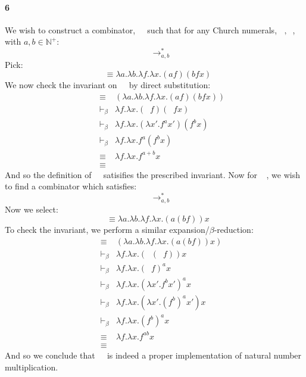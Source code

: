 \documentclass{article}
\begin{document}
\paragraph{6}
\newcommand{\Plus}{\mathop{\underline{Plus}} \:}
\newcommand{\Times}{\mathop{\underline{Times}} \:}
\newcommand{\Comb}[1]{\mathop{\underline{#1}}}

We wish to construct a combinator, $\Plus$ such that for any Church numerals, $\Comb{a}, \Comb{b}$, with $a, b \in \mathbb{N}^+$:
\[ \Plus \Comb{a} \: \Comb{b} \to^*_{a,b} \Comb{a + b} \]
Pick:
\[ \Plus \equiv \lambda a . \lambda b . \lambda f . \lambda x . (a f) (b f x) \]
We now check the invariant on $\Plus$ by direct substitution:
\begin{eqnarray*}
\Plus \Comb{a} \: \Comb{b} & \equiv & (\lambda a . \lambda b . \lambda f . \lambda x . (a f) (b f x)) \Comb{a} \Comb{b}\\
& \vdash_\beta & \lambda f. \lambda x. (\Comb{a} f) (\Comb{b} f x) \\
& \vdash_\beta & \lambda f. \lambda x. (\lambda x'. f^a x') (f^b x) \\
& \vdash_\beta & \lambda f. \lambda x. f^a ( f^b x) \\
& \equiv & \lambda f. \lambda x. f^{a + b} x \\
& \equiv & \Comb{a + b}
\end{eqnarray*}
And so the definition of $\Plus$ satisifies the prescribed invariant.  Now for $\Times$, we wish to find a combinator which satisfies:
\[ \Times \Comb{a} \: \Comb{b} \to^*_{a,b} \Comb{a b} \]
Now we select:
\[ \Times \equiv \lambda a . \lambda b . \lambda f . \lambda x . (a ( b f )) x  \]
To check the invariant, we perform a similar expansion/$\beta$-reduction:
\begin{eqnarray*}
\Times \Comb{a} \: \Comb{b} & \equiv & (\lambda a . \lambda b . \lambda f . \lambda x . (a ( b f )) x) \Comb{a} \: \Comb{b} \\
& \vdash_\beta & \lambda f . \lambda x . (\Comb{a} ( \Comb{b} f )) x \\
& \vdash_\beta & \lambda f . \lambda x . (\Comb{b} f)^a x \\
& \vdash_\beta & \lambda f . \lambda x . (\lambda x' . f^b x')^a x \\
& \vdash_\beta & \lambda f. \lambda x . (\lambda x' . (f^b)^a x') x \\
& \vdash_\beta & \lambda f. \lambda x . (f^b)^a x \\
& \equiv & \lambda f. \lambda x. f^{a b} x \\
& \equiv & \Comb{a b}
\end{eqnarray*}
And so we conclude that $\Times$ is indeed a proper implementation of natural number multiplication.
\end{document}
